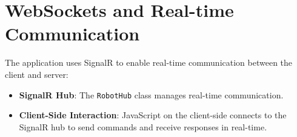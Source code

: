 \section{WebSockets and Real-time Communication}
The application uses SignalR to enable real-time communication between the client and server:
\begin{itemize}
	\item \textbf{SignalR Hub}: The \texttt{RobotHub} class manages real-time communication.
	\item \textbf{Client-Side Interaction}: JavaScript on the client-side connects to the SignalR hub to send commands and receive responses in real-time.
\end{itemize}